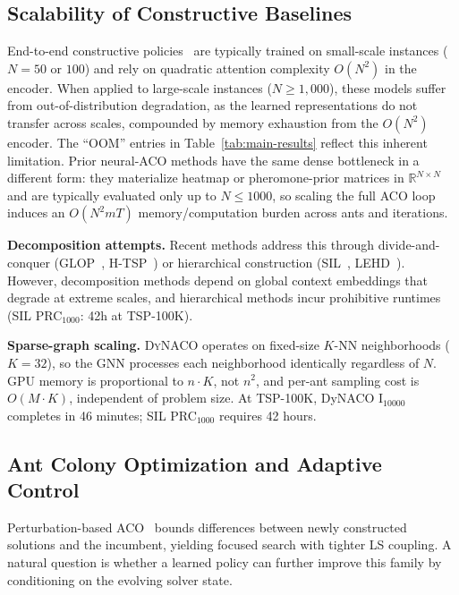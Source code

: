 \documentclass[sigconf]{acmart}
\newcommand{\DyNACO}{\textsc{DyNACO}}
\begin{document}
\subsection{Scalability of Constructive Baselines}
\label{app:constructive-limits}

End-to-end constructive policies~\cite{attentionmodel,pomo,bq,lehd, invit, sigd} are typically trained on small-scale instances ($N{=}50$ or $100$) and rely on quadratic attention complexity $O(N^2)$ in the encoder.
When applied to large-scale instances ($N{\geq}1{,}000$), these models suffer from out-of-distribution degradation, as the learned representations do not transfer across scales, compounded by memory exhaustion from the $O(N^2)$ encoder.
The ``OOM'' entries in Table~\ref{tab:main-results} reflect this inherent limitation.
Prior neural-ACO methods have the same dense bottleneck in a different form: they materialize heatmap or pheromone-prior matrices in $\mathbb{R}^{N\times N}$ and are typically evaluated only up to $N{\leq}1000$, so scaling the full ACO loop induces an $O(N^2 m T)$ memory/computation burden across ants and iterations.

\textbf{Decomposition attempts.}
Recent methods address this through divide-and-conquer (GLOP~\cite{glop}, H-TSP~\cite{htsp}) or hierarchical construction (SIL~\cite{sil}, LEHD~\cite{lehd}).
However, decomposition methods depend on global context embeddings that degrade at extreme scales, and hierarchical methods incur prohibitive runtimes (SIL PRC$_{1000}$: 42h at TSP-100K).

\textbf{Sparse-graph scaling.}
\DyNACO{} operates on fixed-size $K$-NN neighborhoods ($K{=}32$), so the GNN processes each neighborhood identically regardless of $N$.
GPU memory is proportional to $n \cdot K$, not $n^2$, and per-ant sampling cost is $O(M \cdot K)$, independent of problem size.
At TSP-100K, DyNACO I$_{10000}$ completes in 46 minutes; SIL PRC$_{1000}$ requires 42 hours.

\subsection{Ant Colony Optimization and Adaptive Control}
\label{app:aco-background}

Perturbation-based ACO~\cite{partialACO, P-ACO, faco} bounds differences between newly constructed solutions and the incumbent, yielding focused search with tighter LS coupling.
A natural question is whether a learned policy can further improve this family by conditioning on the evolving solver state.
\end{document}

